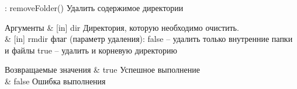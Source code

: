 \+: remove\+Folder() Удалить содержимое директории
\begin{DoxyParams}{Аргументы}
{\em } & \mbox{[}in\mbox{]} dir Директория, которую необходимо очистить. \\
\hline
{\em } & \mbox{[}in\mbox{]} rmdir флаг (параметр удаления)\+: false – удалить только внутренние папки и файлы true – удалить и корневую директорию \\
\hline
\end{DoxyParams}

\begin{DoxyRetVals}{Возвращаемые значения}
{\em } & true Успешное выполнение \\
\hline
{\em } & false Ошибка выполнения \\
\hline
\end{DoxyRetVals}
